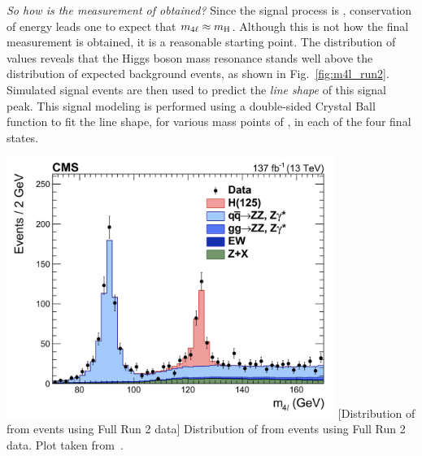 \emph{So how is the measurement of \mH obtained?}
Since the signal process is \hzzfourl, conservation of energy leads one to expect that $m_{4\ell} \approx m_{\mathrm{H}}$.
Although this is not how the final measurement is obtained, it is a reasonable starting point.
The distribution of \mfourl values reveals that the Higgs boson mass resonance stands well above the distribution of expected background events, as shown in Fig.~\ref{fig:m4l_run2}.
Simulated signal events are then used to predict the \emph{line shape} of this signal peak.
This signal modeling is performed using a double-sided Crystal Ball function to fit the line shape, for various mass points of \mH, in each of the four final states.
\begin{multiFigure}
    \centering
    \includegraphics[width=0.8\textwidth,keepaspectratio]{figures/higgsmassmeas/m4l_FullRun2_epjc.jpeg}
		[Distribution of \mfourl from \hzzfourl events using Full Run 2 data]
		{Distribution of \mfourl from \hzzfourl events using Full Run 2 data.
		Plot taken from~\cite{PhysRevLett.114.191803}. %
		}
	\label{fig:m4l_run2}
\end{multiFigure}

